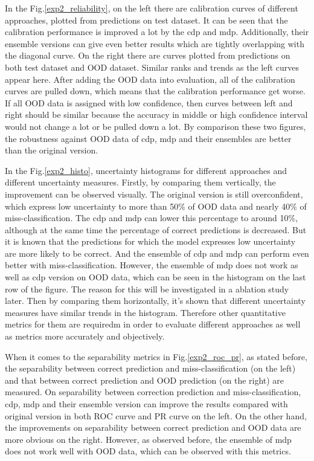 In the Fig.\ref{exp2_reliability}, on the left there are calibration curves of different approaches, plotted from predictions on test dataset. It can be seen that the calibration performance is improved a lot by the cdp and mdp. Additionally, their ensemble versions can give even better results which are tightly overlapping with the diagonal curve. On the right there are curves plotted from predictions on both test dataset and \gls{OOD} dataset. Similar ranks and trends as the left curves appear here. After adding the \gls{OOD} data into evaluation, all of the calibration curves are pulled down, which means that the calibration performance get worse. If all \gls{OOD} data is assigned with low confidence, then curves between left and right should be similar because the accuracy in middle or high confidence interval would not change a lot or be pulled down a lot. By comparison these two figures, the robustness against \gls{OOD} data of cdp, mdp and their ensembles are better than the original version.

In the Fig.\ref{exp2_histo}, uncertainty histograms for different approaches and different uncertainty measures. Firstly, by comparing them vertically, the improvement can be observed visually. The original version is still overconfident, which express low uncertainty to more than 50$\%$ of \gls{OOD} data and nearly 40\% of miss-classification. The  cdp and mdp can lower this percentage to around 10\%, although at the same time the percentage of correct predictions is decreased. But it is known that the predictions for which the model expresses low uncertainty are more likely to be correct. And the ensemble of cdp and mdp can perform even better with miss-classification. However, the ensemble of mdp does not work as well as cdp version on OOD data, which can be seen in the histogram on the last row of the figure. The reason for this will be investigated in a ablation study later. Then by comparing them horizontally, it's shown that different uncertainty measures have similar trends in the histogram. Therefore other quantitative metrics for them are requiredm in order to evaluate different approaches as well as metrics more accurately and objectively.  


When it comes to the separability metrics in Fig.\ref{exp2_roc_pr}, as stated before, the separability between correct prediction and miss-classification (on the left) and that between correct prediction and \gls{OOD} prediction (on the right) are measured. On separability between correction prediction and miss-classification, cdp, mdp and their ensemble version can improve the results compared with original version in both ROC curve and PR curve on the left. On the other hand, the improvements on separability between correct prediction and \gls{OOD} data are more obvious on the right. However, as observed before, the ensemble of mdp does not work well with \gls{OOD} data, which can be observed with this metrics. 

